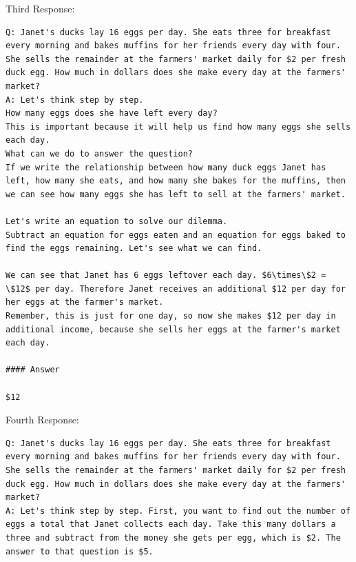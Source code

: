 \documentclass{article} %
\begin{document}
\vspace{10px}
Third Response:
\begin{lstlisting}
Q: Janet's ducks lay 16 eggs per day. She eats three for breakfast every morning and bakes muffins for her friends every day with four. She sells the remainder at the farmers' market daily for $2 per fresh duck egg. How much in dollars does she make every day at the farmers' market?
A: Let's think step by step.
How many eggs does she have left every day?
This is important because it will help us find how many eggs she sells each day.
What can we do to answer the question?
If we write the relationship between how many duck eggs Janet has left, how many she eats, and how many she bakes for the muffins, then we can see how many eggs she has left to sell at the farmers' market.

Let's write an equation to solve our dilemma.
Subtract an equation for eggs eaten and an equation for eggs baked to find the eggs remaining. Let's see what we can find.

We can see that Janet has 6 eggs leftover each day. $6\times\$2 = \$12$ per day. Therefore Janet receives an additional $12 per day for her eggs at the farmer's market.
Remember, this is just for one day, so now she makes $12 per day in additional income, because she sells her eggs at the farmer's market each day.

#### Answer

$12
\end{lstlisting}

\vspace{10px}
Fourth Response:
\begin{lstlisting}
Q: Janet's ducks lay 16 eggs per day. She eats three for breakfast every morning and bakes muffins for her friends every day with four. She sells the remainder at the farmers' market daily for $2 per fresh duck egg. How much in dollars does she make every day at the farmers' market?
A: Let's think step by step. First, you want to find out the number of eggs a total that Janet collects each day. Take this many dollars a three and subtract from the money she gets per egg, which is $2. The answer to that question is $5.
\end{lstlisting}
\end{document}
